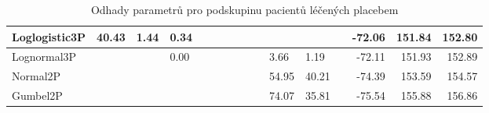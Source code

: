 \documentclass[a4, 11pt]{article}
\theoremstyle{definition}
\theoremstyle{remark}
\begin{document}
\begin{table}[H]
\begin{tabular}{|l|l|l|l|l|l|l|l|l|l|l|l|l|r|r|r|}
           Loglogistic3P  & 40.43  & 1.44 & 0.34 &       &      &        &       &      &      &       &       &      & -72.06 & 151.84 & 152.80 \\ \hline
           Lognormal3P    &        &      & 0.00 &       &      &        &       &      &      & 3.66  & 1.19  &      & -72.11 & 151.93 & 152.89 \\ \hline
           Normal2P       &        &      &      &       &      &        &       &      &      & 54.95 & 40.21 &      & -74.39 & 153.59 & 154.57 \\ \hline
           Gumbel2P       &        &      &      &       &      &        &       &      &      & 74.07 & 35.81 &      & -75.54 & 155.88 & 156.86 \\ \hline
       \end{tabular}
       \caption{Odhady parametrů pro podskupinu pacientů léčených placebem}
       \label{tab:fitall_output_parameters_tab_placebo}
       \normalsize
   \end{table}
    
\end{document}
